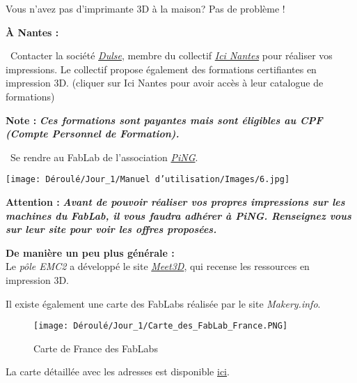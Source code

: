 \begin{flushleft}
Vous n'avez pas d'imprimante 3D à la maison? Pas de problème !\vspace{0.2cm}

\textbf{À Nantes :}

\vspace{0.2cm}
\textbullet \, Contacter la société \href{https://dulse.fr/}{\textit{Dulse}}, membre du collectif \href{https://makeici.org/location-ateliers/nantes/}{\textit{Ici Nantes}} pour réaliser vos impressions. Le collectif propose également des formations certifiantes en impression 3D. (cliquer sur Ici Nantes pour avoir accès à leur catalogue de formations)\vspace{0.2cm}

\textbf{\large Note : }\textbf{\textit{\large Ces formations sont payantes mais sont éligibles au CPF (Compte Personnel de Formation).}}\vspace{0.2cm}

\textbullet \, Se rendre au FabLab de l'association \href{https://info.pingbase.net/faire-ensemble/#1598359300657-bc519d81-3b9f}{\textit{PiNG}}.\vspace{0.2cm}

\begin{multicols}{2}
    \texttt{[image: Déroulé/Jour\_1/Manuel d'utilisation/Images/6.jpg]}
    
    \columnbreak
    
\textbf{Attention : }\textbf{\textit{Avant de pouvoir réaliser vos propres impressions sur les machines du FabLab, il vous faudra adhérer à PiNG. Renseignez vous sur leur site pour voir les offres proposées.}}\\
\end{multicols}
\end{flushleft}

\begin{flushleft}
\textbf{De manière un peu plus générale :}\\
\textbullet \vspace{2mm} Le \textit{pôle EMC2} a développé le site \href{https://meet3d.fr/imprimante/list}{\textit{Meet3D}}, qui recense les ressources en impression 3D.\vspace{0.2cm}

\textbullet \vspace{2mm} Il existe également une carte des FabLabs réalisée par le site \textit{Makery.info}.

\begin{figure}[!h]
    \centering
    \texttt{[image: Déroulé/Jour\_1/Carte\_des\_FabLab\_France.PNG]}
    \caption[Carte des FabLabs]{Carte de France des FabLabs}
    \label{fig:my_label}
\end{figure}
La carte détaillée avec les adresses est disponible \href{https://www.makery.info/labs-map/}{ici}.
\end{flushleft}

